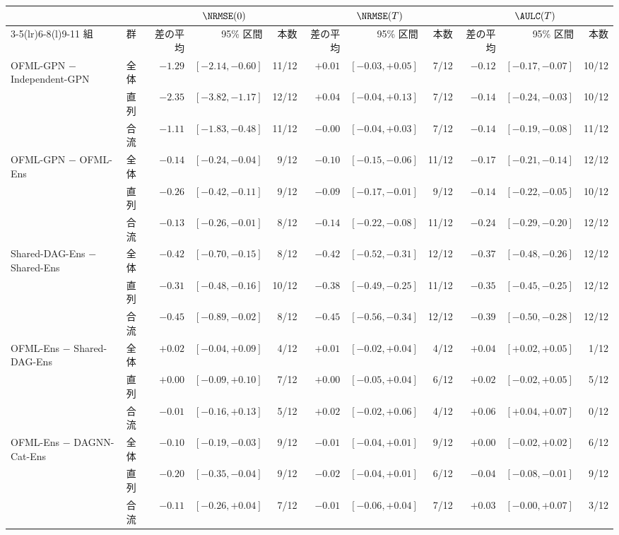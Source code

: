 \begin{tabular}{@{}ll rrr rrr rrr@{}}
\toprule
 & & \multicolumn{3}{c}{$\NRMSE(0)$} & \multicolumn{3}{c}{$\NRMSE(T)$} & \multicolumn{3}{c}{$\AULC(T)$}\\
\cmidrule(lr){3-5}\cmidrule(lr){6-8}\cmidrule(l){9-11}
組 & 群 & 差の平均 & 95\% 区間 & 本数 & 差の平均 & 95\% 区間 & 本数 & 差の平均 & 95\% 区間 & 本数\\
\midrule
OFML-GPN $-$ Independent-GPN & 全体 & $-1.29$ & $[-2.14,-0.60]$ & 11/12 & $+0.01$ & $[-0.03,+0.05]$ & 7/12 & $-0.12$ & $[-0.17,-0.07]$ & 10/12 \\
 & 直列 & $-2.35$ & $[-3.82,-1.17]$ & 12/12 & $+0.04$ & $[-0.04,+0.13]$ & 7/12 & $-0.14$ & $[-0.24,-0.03]$ & 10/12 \\
 & 合流 & $-1.11$ & $[-1.83,-0.48]$ & 11/12 & $-0.00$ & $[-0.04,+0.03]$ & 7/12 & $-0.14$ & $[-0.19,-0.08]$ & 11/12 \\
\addlinespace
OFML-GPN $-$ OFML-Ens & 全体 & $-0.14$ & $[-0.24,-0.04]$ & 9/12 & $-0.10$ & $[-0.15,-0.06]$ & 11/12 & $-0.17$ & $[-0.21,-0.14]$ & 12/12 \\
 & 直列 & $-0.26$ & $[-0.42,-0.11]$ & 9/12 & $-0.09$ & $[-0.17,-0.01]$ & 9/12 & $-0.14$ & $[-0.22,-0.05]$ & 10/12 \\
 & 合流 & $-0.13$ & $[-0.26,-0.01]$ & 8/12 & $-0.14$ & $[-0.22,-0.08]$ & 11/12 & $-0.24$ & $[-0.29,-0.20]$ & 12/12 \\
\addlinespace
Shared-DAG-Ens $-$ Shared-Ens & 全体 & $-0.42$ & $[-0.70,-0.15]$ & 8/12 & $-0.42$ & $[-0.52,-0.31]$ & 12/12 & $-0.37$ & $[-0.48,-0.26]$ & 12/12 \\
 & 直列 & $-0.31$ & $[-0.48,-0.16]$ & 10/12 & $-0.38$ & $[-0.49,-0.25]$ & 11/12 & $-0.35$ & $[-0.45,-0.25]$ & 12/12 \\
 & 合流 & $-0.45$ & $[-0.89,-0.02]$ & 8/12 & $-0.45$ & $[-0.56,-0.34]$ & 12/12 & $-0.39$ & $[-0.50,-0.28]$ & 12/12 \\
\addlinespace
OFML-Ens $-$ Shared-DAG-Ens & 全体 & $+0.02$ & $[-0.04,+0.09]$ & 4/12 & $+0.01$ & $[-0.02,+0.04]$ & 4/12 & $+0.04$ & $[+0.02,+0.05]$ & 1/12 \\
 & 直列 & $+0.00$ & $[-0.09,+0.10]$ & 7/12 & $+0.00$ & $[-0.05,+0.04]$ & 6/12 & $+0.02$ & $[-0.02,+0.05]$ & 5/12 \\
 & 合流 & $-0.01$ & $[-0.16,+0.13]$ & 5/12 & $+0.02$ & $[-0.02,+0.06]$ & 4/12 & $+0.06$ & $[+0.04,+0.07]$ & 0/12 \\
\addlinespace
OFML-Ens $-$ DAGNN-Cat-Ens & 全体 & $-0.10$ & $[-0.19,-0.03]$ & 9/12 & $-0.01$ & $[-0.04,+0.01]$ & 9/12 & $+0.00$ & $[-0.02,+0.02]$ & 6/12 \\
 & 直列 & $-0.20$ & $[-0.35,-0.04]$ & 9/12 & $-0.02$ & $[-0.04,+0.01]$ & 6/12 & $-0.04$ & $[-0.08,-0.01]$ & 9/12 \\
 & 合流 & $-0.11$ & $[-0.26,+0.04]$ & 7/12 & $-0.01$ & $[-0.06,+0.04]$ & 7/12 & $+0.03$ & $[-0.00,+0.07]$ & 3/12 \\
\bottomrule
\end{tabular}
